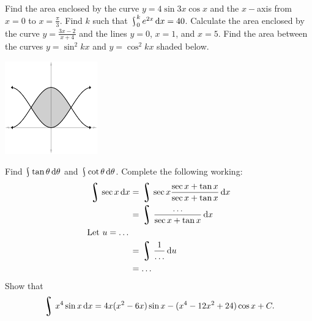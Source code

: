 \begin{questions}
  \questioM Find the area enclosed by the curve $ y = 4 \sin 3x \cos x $ and the $ x-$axis from $ x = 0 $
            to $ x = \frac{\pi}{3} $.
  \questioE Find $ k $ such that $ \rint^k_0 e^{2x} \dif{x} = 40 $.
  \questioE Calculate the area enclosed by the curve $ y = \frac{3x - 2}{x + 4} $ and the lines $ y = 0 $, $ x = 1 $,
            and $ x = 5 $.
  \questioE Find the area between the curves $ y = \sin^2 kx $ and $ y = \cos^2 kx $ shaded below.
            \begin{center}
              \includegraphics[width=0.3\textwidth]{int4}
            \end{center}
  \questioM Find $ \rint \tan \theta \dif{\theta} $ and $ \rint \cot \theta \dif{\theta} $.
  \questioA Complete the following working:
    \begin{align*}
      \rint \sec x \dif{x} &= \rint \sec x \frac{\sec x + \tan x}{\sec x + \tan x} \dif{x}\\
                           &= \rint \frac{\dots}{\sec x + \tan x} \dif{x}\\
                           \text{Let $ u = \dots $}\\
                           &= \rint \frac{1}{\dots} \dif{u}\\
                           &= \dots
    \end{align*}
  \questioM Show that
    \begin{displaymath}
      \rint x^4 \sin x \dif{x} = 4x(x^2 - 6x) \sin x - (x^4 - 12x^2 + 24) \cos x + C.

\end{displaymath}
\end{questions}
